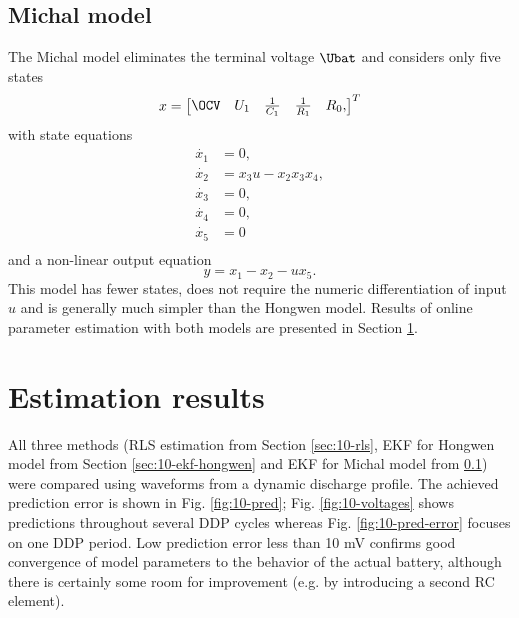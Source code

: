 \subsection{Michal model}
\label{sec:10-ekf-michal}
The Michal model eliminates the terminal voltage $\Ubat$ and considers only five states
\begin{equation}
    x = \begin{bmatrix}
        \OCV & U_1  & \frac{1}{C_1} & \frac{1}{R_1} & R_0,
    \end{bmatrix}^T
\end{equation}
with state equations
\begin{equation}
\begin{aligned}
    \dot{x_1} &= 0, \\
    \dot{x_2} &= x_3 u - x_2 x_3 x_4, \\
    \dot{x_3} &= 0, \\
    \dot{x_4} &= 0, \\
    \dot{x_5} &= 0 \\
\end{aligned}
\end{equation}
and a non-linear output equation
\begin{equation}
    y = x_1 - x_2 - u x_5.
\end{equation}
This model has fewer states, does not require the numeric differentiation of input $u$ and is generally much simpler than the Hongwen model. Results of online parameter estimation with both models are presented in Section \ref{sec:10-results}.

\clearpage
\section{Estimation results}
\label{sec:10-results}

All three methods (RLS estimation from Section \ref{sec:10-rls}, EKF for Hongwen model from Section \ref{sec:10-ekf-hongwen} and EKF for Michal model from \ref{sec:10-ekf-michal}) were compared using waveforms from a dynamic discharge profile. The achieved prediction error is shown in Fig. \ref{fig:10-pred}; Fig. \ref{fig:10-voltages} shows predictions throughout several DDP cycles whereas Fig. \ref{fig:10-pred-error} focuses on one DDP period. Low prediction error less than 10 mV confirms good convergence of model parameters to the behavior of the actual battery, although there is certainly some room for improvement (e.g. by introducing a second RC element).

